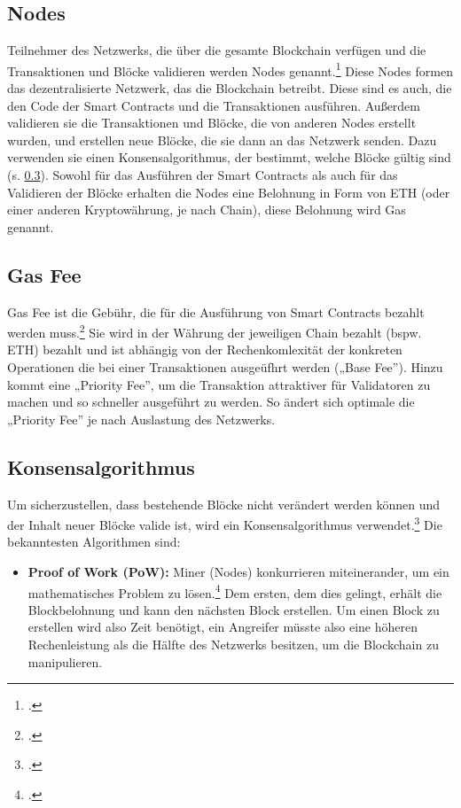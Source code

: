 \documentclass[12pt, a4paper]{article}
\begin{document}
{\subsection{Nodes}
\label{sec:definition-nodes}
Teilnehmer des Netzwerks, die über die gesamte Blockchain verfügen und die Transaktionen und Blöcke validieren werden Nodes genannt.\footcites[Vgl. hierzu und zum Folgenden][]{w12}[]{w13} 
Diese Nodes formen das dezentralisierte Netzwerk, das die Blockchain betreibt.
Diese sind es auch, die den Code der Smart Contracts und die Transaktionen ausführen.
Außerdem validieren sie die Transaktionen und Blöcke, die von anderen Nodes erstellt wurden, und erstellen neue Blöcke, die sie dann an das Netzwerk senden.
Dazu verwenden sie einen Konsensalgorithmus, der bestimmt, welche Blöcke gültig sind (s. \ref{sec:definition-konsensalgorithmus}). 
Sowohl für das Ausführen der Smart Contracts als auch für das Validieren der Blöcke erhalten die Nodes eine Belohnung in Form von ETH (oder einer anderen Kryptowährung, je nach Chain), diese Belohnung wird Gas genannt.
\subsection{Gas Fee}
\label{sec:definition-gas-fee}
Gas Fee ist die Gebühr, die für die Ausführung von Smart Contracts bezahlt werden muss.\footcite[Vgl. hierzu und zum Folgenden][]{w31} 
Sie wird in der Währung der jeweiligen Chain bezahlt (bspw. ETH) bezahlt und ist abhängig von der Rechenkomlexität der konkreten Operationen die bei einer Transaktionen ausgeüfhrt werden („Base Fee”).
Hinzu kommt eine „Priority Fee”, um die Transaktion attraktiver für Validatoren zu machen und so schneller ausgeführt zu werden.
So ändert sich optimale die „Priority Fee” je nach Auslastung des Netzwerks. 
\subsection{Konsensalgorithmus}
\label{sec:definition-konsensalgorithmus}
Um sicherzustellen, dass bestehende Blöcke nicht verändert werden können und der Inhalt neuer Blöcke valide ist, wird ein Konsensalgorithmus verwendet.\footcite[Vgl.][S. 2 f\adddot]{q4}
Die bekanntesten Algorithmen sind:
\begin{itemize}
    \item \textbf{Proof of Work (PoW):}
    Miner (Nodes) konkurrieren miteinerander, um ein mathematisches Problem zu lösen.\footcite[Vgl. hierzu und zum Folgenden][3]{q4}
    Dem ersten, dem dies gelingt, erhält die Blockbelohnung und kann den nächsten Block erstellen.
    Um einen Block zu erstellen wird also Zeit benötigt, ein Angreifer müsste also eine höheren Rechenleistung als die Hälfte des Netzwerks besitzen, um die Blockchain zu manipulieren.


\end{itemize}}
\end{document}
